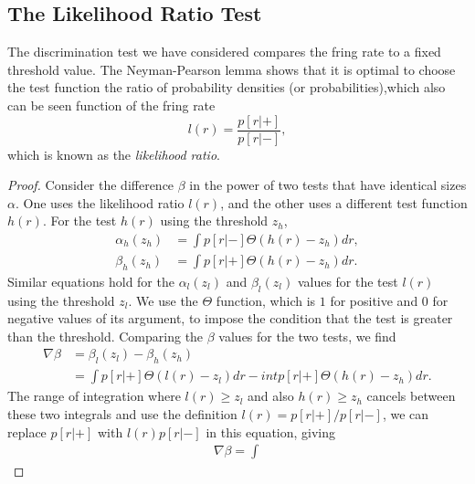 \subsection{The Likelihood Ratio Test}
\begin{lem}
  The discrimination test we have considered compares the fring rate
  to a fixed threshold value. The Neyman-Pearson lemma shows that it is
  optimal to choose the test function the ratio of
  probability densities (or probabilities),which also can be seen function of the fring rate
  \begin{equation}
    \label{eq:3.12}
    l(r)=\frac{p[r|+]}{p[r|-]},
  \end{equation}
  which is known as the \emph{likelihood ratio}.
  
  \begin{proof}
Consider the difference $\beta$ in the power of two tests that have identical
sizes $\alpha$. One uses the likelihood ratio $l(r)$, and the other uses a different
test function $h(r)$. For the test $h(r)$ using the threshold $z_{h}$,
\begin{equation}
  \label{eq:3.61}
  \begin{aligned}
    \alpha_h(z_h)&=\int {p[r|-]\Theta(h(r)-z_h)dr},\\
    \beta_h(z_h)&=\int {p[r|+]\Theta(h(r)-z_h)dr}.
  \end{aligned}
\end{equation}
Similar equations hold for the $\alpha_l(z_{l})$ and $\beta_l(z_l)$
values for the test $l(r)$ using
the threshold $z_{l}$. We use the $\Theta$  function, which is $1$ for positive and $0$ for
negative values of its argument, to impose the condition that the test is
greater than the threshold. Comparing the $\beta$ values for the two tests, we
find
\begin{equation}
  \label{eq:3.62}
  \begin{aligned}
    \nabla\beta&=\beta_l(z_l)-\beta_h(z_h)\\
                 &=\int{p[r|+]\Theta(l(r)-z_l)dr}-int {p[r|+]\Theta(h(r)-z_h)dr}.
  \end{aligned}
\end{equation}
The range of integration where $l(r)\geq z_l$ and also  $h(r)\geq z_{h}$  cancels between
these two integrals and use the definition $ l(r)=p[r|+]/{p[r|-]}$,
we can replace ${p[r|+]}$ with $l(r){p[r|-]}$ in this equation, giving
\begin{equation}
  \label{eq:3.64}
  \begin{split}
     \nabla\beta=\int{
}
\end{split}
\end{equation}
\end{proof}
\end{lem}
